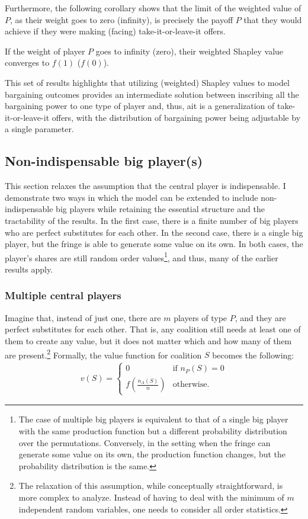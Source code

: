 Furthermore, the following corollary shows that the limit of the weighted value of $P$, as their weight goes to zero (infinity), is precisely the payoff $P$ that they would achieve if they were making (facing) take-it-or-leave-it offers.
\begin{corollary}
    \label{cor:paltform_value_weighted_2}
    If the weight of player $P$ goes to infinity (zero), their weighted Shapley value converges to $f(1)$ ($f(0)$).
\end{corollary}
This set of results highlights that utilizing (weighted) Shapley values to model bargaining outcomes provides an intermediate solution between inscribing all the bargaining power to one type of player and, thus, ait is a generalization of take-it-or-leave-it offers, with the distribution of bargaining power being adjustable by a single parameter.


\subsection{Non-indispensable big player(s)}
\label{sec:extensions}

This section relaxes the assumption that the central player is indispensable.
I demonstrate two ways in which the model can be extended to include non-indispensable big players while retaining the essential structure and the tractability of the results.
In the first case, there is a finite number of big players who are perfect substitutes for each other.
In the second case, there is a single big player, but the fringe is able to generate some value on its own.
In both cases, the player's shares are still random order values\footnote{
    The case of multiple big players is equivalent to that of a single big player with the same production function but a different probability distribution over the permutations.
    Conversely, in the setting when the fringe can generate some value on its own, the production function changes, but the probability distribution is the same.
}, and thus, many of the earlier results apply.

\subsubsection{Multiple central players}

Imagine that, instead of just one, there are $m$ players of type $P$, and they are perfect substitutes for each other.
That is, any coalition still needs at least one of them to create any value, but it does not matter which and how many of them are present.\footnote{
    The relaxation of this assumption, while conceptually straightforward, is more complex to analyze.
    Instead of having to deal with the minimum of $m$ independent random variables, one needs to consider all order statistics.
}
Formally, the value function for coalition $S$ becomes the following:
\begin{align*}
    v(S) = \begin{cases}
        0                              & \text{if } n_P(S) = 0 \\
        f\left(\frac{n_A(S)}{n}\right) & \text{otherwise}.
    \end{cases}
\end{align*}

